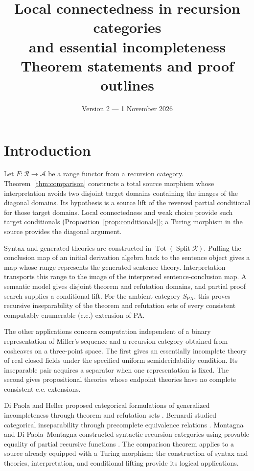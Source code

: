 \documentclass[11pt]{article}
\title{Local connectedness in recursion categories\\and essential incompleteness\\[1ex]\large Theorem statements and proof outlines}
\author{}
\date{Version 2 --- 1 November 2026}
\theoremstyle{definition}\newtheorem{definition}[theorem]{Definition}
\newcommand{\PA}{\mathrm{PA}}
\newcommand{\Tot}{\operatorname{Tot}}
\newcommand{\Split}{\operatorname{Split}}
\newcommand{\R}{\mathscr R}
\newcommand{\A}{\mathcal A}
\begin{document}
\maketitle
\begingroup\small
\tableofcontents
\endgroup
\newpage

\section{Introduction}
Let $F:\R\to\A$ be a range functor from a recursion category.
Theorem~\ref{thm:comparison} constructs a total source morphism whose
interpretation avoids two disjoint target domains containing the images
of the diagonal domains. Its hypothesis is a source lift of the reversed
partial conditional for those target domains. Local connectedness and
weak choice provide such target conditionals
(Proposition~\ref{prop:conditionals}); a Turing morphism in the source
provides the diagonal argument.

Syntax and generated theories are constructed in
$\Tot(\Split\R)$. Pulling the conclusion map of an initial derivation
algebra back to the sentence object gives a map whose range represents
the generated sentence theory. Interpretation transports this range to
the image of the interpreted sentence-conclusion map. A semantic
model gives disjoint theorem and refutation domains, and partial proof
search supplies a conditional lift. For the ambient category $S_{\PA}$,
this proves recursive inseparability of the theorem and refutation sets
of every consistent computably enumerable (c.e.) extension of PA.

The other applications concern computation independent of a binary
representation of Miller's sequence and a recursion category obtained
from cosheaves on a three-point space. The first gives an essentially
incomplete theory of real closed fields under the specified uniform
semidecidability condition. Its inseparable pair acquires a separator
when one representation is fixed. The second gives propositional
theories whose endpoint theories have no complete consistent c.e.
extensions.

Di Paola and Heller proposed categorical formulations of generalized
incompleteness through theorem and refutation sets \cite{DPH}.
Bernardi studied categorical inseparability through precomplete
equivalence relations \cite{Bernardi}. Montagna and Di Paola--Montagna
constructed syntactic recursion categories using provable equality of
partial recursive functions \cite{Montagna,DPM}. The comparison theorem
applies to a source already equipped with a Turing morphism; the
construction of syntax and theories, interpretation, and conditional
lifting provide its logical applications.
\end{document}
